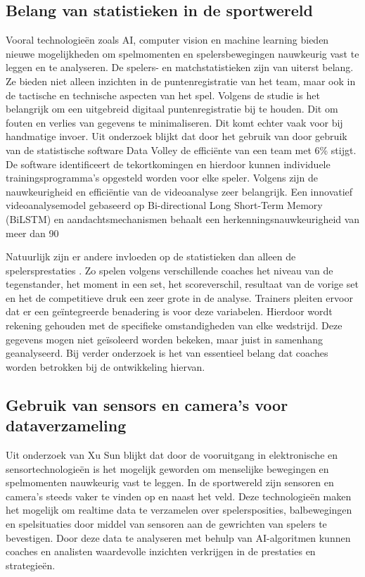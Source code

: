 \subsection{Belang van statistieken in de sportwereld}
Vooral technologieën zoals AI, computer vision en machine learning bieden nieuwe mogelijkheden om spelmomenten en spelersbewegingen nauwkeurig vast te leggen en te analyseren. De spelers- en matchstatistieken \autocite{Wahyuti2023} zijn van uiterst belang. Ze bieden niet alleen inzichten in de puntenregistratie van het team, maar ook in de tactische en technische aspecten van het spel. Volgens de studie is het belangrijk om een uitgebreid digitaal puntenregistratie bij te houden. Dit om fouten en verlies van gegevens te minimaliseren. Dit komt echter vaak voor bij handmatige invoer. Uit onderzoek \autocite{Harabagiu2023} blijkt dat door het gebruik van door gebruik van de statistische software Data Volley de efficiënte van een team met 6\% stijgt. De software identificeert de tekortkomingen en hierdoor kunnen individuele trainingsprogramma's opgesteld worden voor elke speler. Volgens \textcite{Ruiye2024} zijn de nauwkeurigheid en efficiëntie van de videoanalyse zeer belangrijk. Een innovatief videoanalysemodel gebaseerd op Bi-directional Long Short-Term Memory (BiLSTM) en aandachtsmechanismen behaalt een herkenningsnauwkeurigheid van meer dan 90%

Natuurlijk zijn er andere invloeden op de statistieken dan alleen de spelersprestaties \autocite{LopezSerrano2022}. Zo spelen volgens verschillende coaches het niveau van de tegenstander, het moment in een set, het scoreverschil, resultaat van de vorige set en het de competitieve druk een zeer grote in de analyse. Trainers pleiten ervoor dat er een geïntegreerde benadering is voor deze variabelen. Hierdoor wordt rekening gehouden met de specifieke omstandigheden van elke wedstrijd. Deze gegevens mogen niet geïsoleerd worden bekeken, maar juist in samenhang geanalyseerd. Bij verder onderzoek is het van essentieel belang dat coaches worden betrokken bij de ontwikkeling hiervan.

\subsection{Gebruik van sensors en camera's voor dataverzameling}
Uit onderzoek van Xu Sun \textcite{Sun2021} blijkt dat door de vooruitgang in elektronische en sensortechnologieën is het mogelijk geworden om menselijke bewegingen en spelmomenten nauwkeurig vast te leggen. In de sportwereld zijn sensoren en camera's steeds vaker te vinden op en naast het veld. Deze technologieën maken het mogelijk om realtime data te verzamelen over spelersposities, balbewegingen en spelsituaties door middel van sensoren aan de gewrichten van spelers te bevestigen. Door deze data te analyseren met behulp van AI-algoritmen kunnen coaches en analisten waardevolle inzichten verkrijgen in de prestaties en strategieën.

